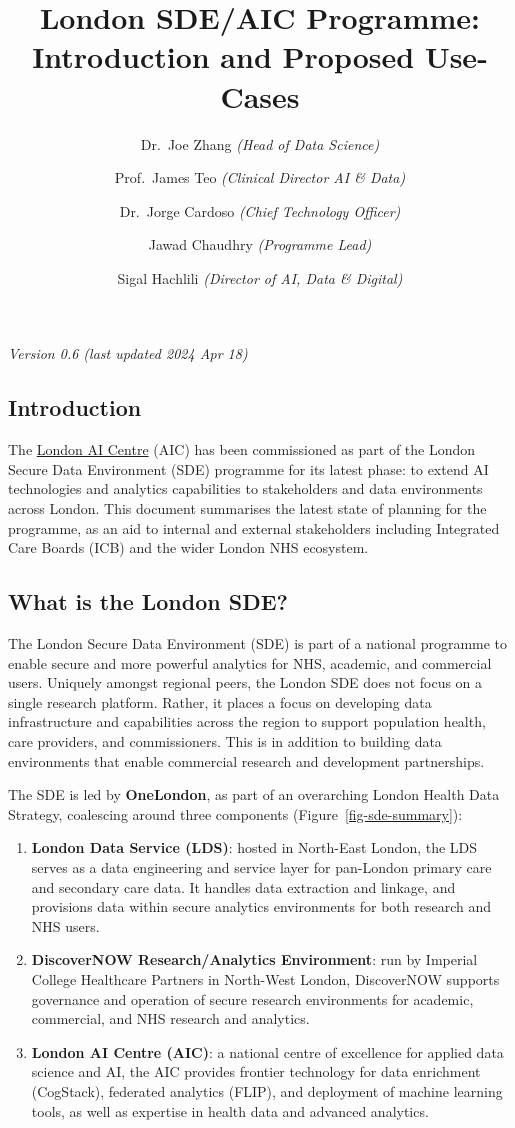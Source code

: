 \documentclass[
  letterpaper,
  DIV=11,
  numbers=noendperiod]{scrartcl}
\title{London SDE/AIC Programme: Introduction and Proposed Use-Cases}
\author{Dr.~Joe Zhang \emph{(Head of Data Science)} \and Prof.~James Teo
\emph{(Clinical Director AI \& Data)} \and Dr.~Jorge Cardoso
\emph{(Chief Technology Officer)} \and Jawad Chaudhry \emph{(Programme
Lead)} \and Sigal Hachlili \emph{(Director of AI, Data \& Digital)}}
\date{}
\begin{document}
\maketitle

\emph{Version 0.6 (last updated 2024 Apr 18)}

\subsection{Introduction}\label{introduction}

The \href{https://www.aicentre.co.uk/}{London AI Centre} (AIC) has been
commissioned as part of the London Secure Data Environment (SDE)
programme for its latest phase: to extend AI technologies and analytics
capabilities to stakeholders and data environments across London. This
document summarises the latest state of planning for the programme, as
an aid to internal and external stakeholders including Integrated Care
Boards (ICB) and the wider London NHS ecosystem.

\subsection{What is the London SDE?}\label{what-is-the-london-sde}

The London Secure Data Environment (SDE) is part of a national programme
to enable secure and more powerful analytics for NHS, academic, and
commercial users. Uniquely amongst regional peers, the London SDE does
not focus on a single research platform. Rather, it places a focus on
developing data infrastructure and capabilities across the region to
support population health, care providers, and commissioners. This is in
addition to building data environments that enable commercial research
and development partnerships.

The SDE is led by \textbf{OneLondon}, as part of an overarching London
Health Data Strategy, coalescing around three components
(Figure~\ref{fig-sde-summary}):

\begin{enumerate}
\def\labelenumi{(\arabic{enumi})}
\item
  \textbf{London Data Service (LDS)}: hosted in North-East London, the
  LDS serves as a data engineering and service layer for pan-London
  primary care and secondary care data. It handles data extraction and
  linkage, and provisions data within secure analytics environments for
  both research and NHS users.
\item
  \textbf{DiscoverNOW Research/Analytics Environment}: run by Imperial
  College Healthcare Partners in North-West London, DiscoverNOW supports
  governance and operation of secure research environments for academic,
  commercial, and NHS research and analytics.
\item
  \textbf{London AI Centre (AIC)}: a national centre of excellence for
  applied data science and AI, the AIC provides frontier technology for
  data enrichment (CogStack), federated analytics (FLIP), and deployment
  of machine learning tools, as well as expertise in health data and
  advanced analytics.
\end{enumerate}
\end{document}
